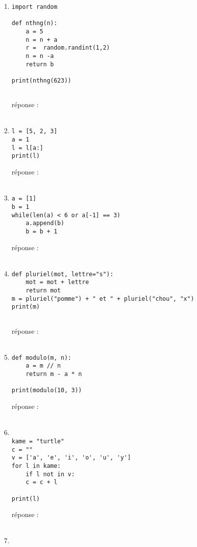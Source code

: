 \documentclass[12pt,a4paper]{article}
\newcommand{\response}{réponse : \hrulefill\\\\}
\begin{document}
\begin{enumerate}
\begin{lstlisting}
l = [1, 2]
l = wtf(l)
l = wtf(l)
print(l)
\end{lstlisting}
\response %

\pagebreak

\item
\begin{lstlisting}
import random

def nthng(n):
	a = 5
	n = n + a
	r =  random.randint(1,2)
	n = n -a
	return b
	
print(nthng(623))
	
\end{lstlisting}
\response %


\item
\begin{lstlisting}
l = [5, 2, 3]
a = 1
l = l[a:]
print(l)
\end{lstlisting}
\response %

\item
\begin{lstlisting}
a = [1]
b = 1
while(len(a) < 6 or a[-1] == 3)
	a.append(b)
	b = b + 1

\end{lstlisting}
\response %

\item
\begin{lstlisting}
def pluriel(mot, lettre="s"):
	mot = mot + lettre
	return mot
m = pluriel("pomme") + " et " + pluriel("chou", "x")
print(m)
	
\end{lstlisting}
\response %

\item
\begin{lstlisting}
def modulo(m, n):
	a = m // n
	return m - a * n
	
print(modulo(10, 3))
\end{lstlisting}
\response %

\item

\begin{lstlisting}

kame = "turtle"
c = ""
v = ['a', 'e', 'i', 'o', 'u', 'y']
for l in kame:
	if l not in v:
	c = c + l
	
print(l)

\end{lstlisting}
\response %

\pagebreak

\item
\begin{lstlisting}


\end{lstlisting}
\end{enumerate}
\end{document}
